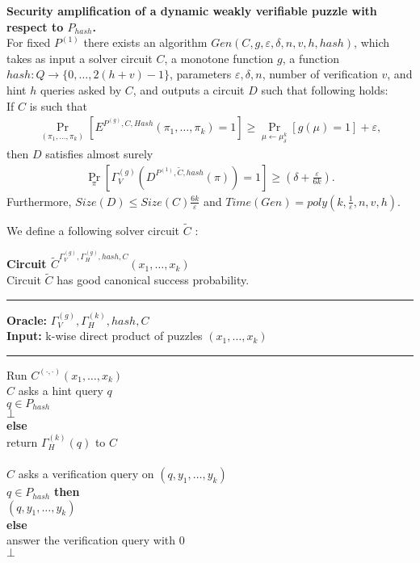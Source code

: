 \begin{lemma}
  \label{lemma:sec_amp_for_p_hash}
  \textbf{Security amplification of a dynamic weakly verifiable puzzle with respect to $P_{hash}$.} \\
  For fixed $P^{(1)}$ there exists an algorithm $Gen(C, g, \varepsilon, \delta, n, v, h, hash)$,
  which takes as input a solver circuit $C$, a monotone function $g$,
  a function $hash : Q \rightarrow \{0, \dots, 2(h+v)-1\}$, parameters $\varepsilon, \delta, n$,
  number of verification $v$, and hint $h$ queries asked by $C$, and outputs a circuit $D$
  such that following holds: \\
  If $C$ is such that \\
  \begin{align*}
    \underset{(\pi_1, \dots, \pi_k)}{\Pr}[E^{P^{(g)}, C, Hash}(\pi_1, \dots, \pi_k)=1] \geq \underset{\mu \leftarrow \mu_\delta^k}{\Pr}[g(\mu) = 1] + \varepsilon,
  \end{align*}
  then $D$ satisfies almost surely
  \begin{align*}
    \underset{\pi}{\Pr}[\Gamma_V^{(g)}(D^{P^{(1)},\widetilde{C},hash}(\pi)) = 1] \geq (\delta + \frac{\varepsilon}{6k}).
  \end{align*}
  Furthermore, $Size(D) \leq Size(C)\frac{6k}{\varepsilon}$ and $Time(Gen) = poly(k, \frac{1}{\varepsilon}, n, v, h)$.
\end{lemma}
%
%
We define a following solver circuit $\widetilde{C}$ :
\begin{codeblock}
  \textbf{Circuit $\widetilde{C}^{\Gamma_V^{(g)}, \Gamma_H^{(g)}, hash, C} (x_1, \dots, x_k)$} \\
  Circuit $\widetilde{C}$ has good canonical success probability.
  \medskip

  \hrule

  \medskip

  \textbf{Oracle:} $\Gamma_V^{(g)}, \Gamma_H^{(k)}, hash, C$ \\
  \textbf{Input:} k-wise direct product of puzzles $(x_1, \dots, x_k)$

  \medskip\hrule\medskip
  Run $C^{(\cdot,\cdot)}(x_1, \dots, x_k)$ \\
  \IndI \If $C$ asks a hint query $q$ \then\\
  \IndII \If $q \in P_{hash}$ \then\\
  \IndIII \return $\bot$\\
  \IndII \textbf{else}\\
  \IndIII return $\Gamma_H^{(k)}(q)$ to $C$\\
  \\
  \IndI \If $C$ asks a verification query on $(q, y_1, \dots, y_k)$ \then \\
  \IndII \If $q \in P_{hash}$ \textbf{then} \\
  \IndIII \return $(q, y_1, \dots, y_k)$ \\
  \IndII \textbf{else} \\
  \IndIII answer the verification query with 0 \\
  \return $\bot$
\end{codeblock}
